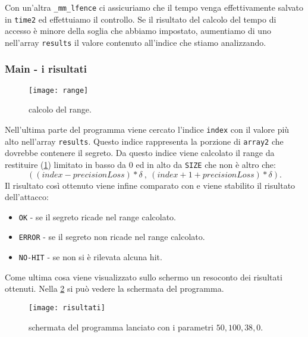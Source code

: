 				Con un'altra \texttt{\_mm\_lfence} ci assicuriamo che il tempo venga effettivamente salvato in \texttt{time2} ed effettuiamo il controllo. Se il risultato del calcolo del tempo di accesso è minore della soglia che abbiamo impostato, aumentiamo di uno nell'array \texttt{results} il valore  contenuto all'indice che stiamo analizzando.
				
				\subsubsection{Main - i risultati}
				
				\begin{figure}[b]
					\begin{center}
						\texttt{[image: range]}
						\caption[Schermata di SPARK]{calcolo del range.}
						\label{fig:range}
					\end{center}
				\end{figure}
				
				Nell'ultima parte del programma viene cercato l'indice \texttt{index} con il valore più alto nell'array \texttt{results}. Questo indice rappresenta la porzione di \texttt{array2} che dovrebbe contenere il segreto. Da questo indice viene calcolato il range da restituire (\cref{fig:range}) limitato in basso da $0$ ed in alto da \texttt{SIZE} che non è altro che: $$((index - precisionLoss) * \delta\ ,\ (index + 1 + precisionLoss) * \delta).$$ Il risultato così ottenuto viene infine comparato con  e viene stabilito il risultato dell'attacco:
				
				\begin{itemize}
					\item \texttt{OK} - se il segreto ricade nel range calcolato.
					\item \texttt{ERROR} - se il segreto non ricade nel range calcolato.
					\item \texttt{NO-HIT} - se non si è rilevata alcuna hit.
				\end{itemize}
				
				Come ultima cosa viene visualizzato sullo schermo un resoconto dei risultati ottenuti. Nella \cref{fig:schermata} si può vedere la schermata del programma.
				
				\begin{figure}
					\begin{center}
						\texttt{[image: risultati]}
						\caption[schermata di SPARK]{schermata del programma lanciato con i parametri $50,100,38,0$.}
						\label{fig:schermata}
					\end{center}
				\end{figure}
			
